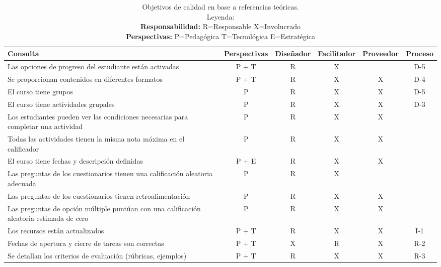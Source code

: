 \begin{center}
    \centering
    \label{tabla:2}
    \begin{longtable}{p{3cm} c c c c c}
            \caption{Objetivos de calidad en base a referencias teóricas.\\
                Leyenda:\\
                \textbf{Responsabilidad:} R=Responsable X=Involucrado\\
                \textbf{Perspectivas:} P=Pedagógica T=Tecnológica E=Estratégica
            }\\
        \hline
        Consulta & Perspectivas & Diseñador & Facilitador & Proveedor & Proceso\\
        \endhead
        \hline
        Las opciones de progreso del estudiante están activadas & P + T & R & X & & D-5 \\
        \hline
        Se proporcionan contenidos en diferentes formatos & P + T & R  & X & X & D-4\\
        \hline
        El curso tiene grupos & P & R & X & X & D-5 \\
        \hline
        El curso tiene actividades grupales & P & R & X & X & D-3 \\
        \hline
        Los estudiantes pueden ver las condiciones necesarias para completar una actividad & P & R & X & X & \\
        \hline
        Todas las actividades tienen la misma nota máxima en el calificador & P & R & X & X & \\
        \hline
        El curso tiene fechas y descripción definidas & P + E & R & X & X & \\
        \hline
        Las preguntas de los cuestionarios tienen una calificación aleatoria adecuada & P  & R & X &  & \\
        \hline        
        Las preguntas de los cuestionarios tienen retroalimentación & P & R & X & X & \\
        \hline
        Las preguntas de opción múltiple puntúan con una calificación aleatoria estimada de cero & P & R & X & X & \\
        \hline
        Los recursos están actualizados & P + T & R & X & X & I-1 \\
        \hline
        Fechas de apertura y cierre de tareas son correctas & P + T & X & R & X & R-2 \\
        \hline
        Se detallan los criterios de evaluación (rúbricas, ejemplos) & P + T & R & X & X & R-3 \\

\end{longtable}
\end{center}
